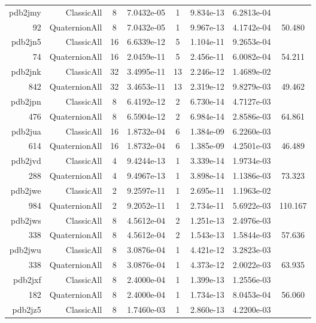 \begin{xltabular}{\textwidth}{r|rcS[table-format=1.4e+2]cS[table-format=1.3e+2]S[table-format=1.4e+2]S[table-format=-1.3]}
pdb2jmy & ClassicAll & 8 & 7.0432e-05 & 1 & 9.834e-13 & 6.2813e-04 & \\
92 & QuaternionAll & 8 & 7.0432e-05 & 1 & 9.967e-13 & 4.1742e-04 & 50.480\\  \addlinespace
pdb2jn5 & ClassicAll & 16 & 6.6339e-12 & 5 & 1.104e-11 & 9.2653e-04 & \\
74 & QuaternionAll & 16 & 2.0459e-11 & 5 & 2.456e-11 & 6.0082e-04 & 54.211\\  \addlinespace
pdb2jnk & ClassicAll & 32 & 3.4995e-11 & 13 & 2.246e-12 & 1.4689e-02 & \\
842 & QuaternionAll & 32 & 3.4653e-11 & 13 & 2.319e-12 & 9.8279e-03 & 49.462\\  \addlinespace
pdb2jpn & ClassicAll & 8 & 6.4192e-12 & 2 & 6.730e-14 & 4.7127e-03 & \\
476 & QuaternionAll & 8 & 6.5904e-12 & 2 & 6.984e-14 & 2.8586e-03 & 64.861\\  \addlinespace
pdb2jua & ClassicAll & 16 & 1.8732e-04 & 6 & 1.384e-09 & 6.2260e-03 & \\
614 & QuaternionAll & 16 & 1.8732e-04 & 6 & 1.385e-09 & 4.2501e-03 & 46.489\\  \addlinespace
pdb2jvd & ClassicAll & 4 & 9.4244e-13 & 1 & 3.339e-14 & 1.9734e-03 & \\
288 & QuaternionAll & 4 & 9.4967e-13 & 1 & 3.898e-14 & 1.1386e-03 & 73.323\\  \addlinespace
pdb2jwe & ClassicAll & 2 & 9.2597e-11 & 1 & 2.695e-11 & 1.1963e-02 & \\
984 & QuaternionAll & 2 & 9.2052e-11 & 1 & 2.734e-11 & 5.6922e-03 & 110.167\\  \addlinespace
pdb2jws & ClassicAll & 8 & 4.5612e-04 & 2 & 1.251e-13 & 2.4976e-03 & \\
338 & QuaternionAll & 8 & 4.5612e-04 & 2 & 1.543e-13 & 1.5844e-03 & 57.636\\  \addlinespace
pdb2jwu & ClassicAll & 8 & 3.0876e-04 & 1 & 4.421e-12 & 3.2823e-03 & \\
338 & QuaternionAll & 8 & 3.0876e-04 & 1 & 4.373e-12 & 2.0022e-03 & 63.935\\  \addlinespace
pdb2jxf & ClassicAll & 8 & 2.4000e-04 & 1 & 1.399e-13 & 1.2556e-03 & \\
182 & QuaternionAll & 8 & 2.4000e-04 & 1 & 1.734e-13 & 8.0453e-04 & 56.060\\  \addlinespace
pdb2jz5 & ClassicAll & 8 & 1.7460e-03 & 1 & 2.860e-13 & 4.2200e-03 & \\

\end{xltabular}
